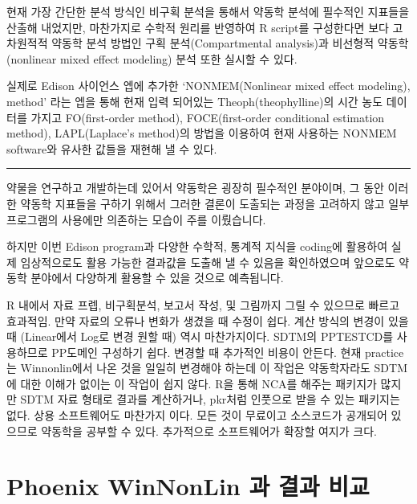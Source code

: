 \documentclass[
  10pt,
]{krantz}
\begin{document}
현재 가장 간단한 분석 방식인 비구획 분석을 통해서 약동학 분석에 필수적인 지표들을 산출해 내었지만, 마찬가지로 수학적 원리를 반영하여 R script를 구성한다면 보다 고차원적적 약동학 분석 방법인 구획 분석(Compartmental analysis)과 비선형적 약동학(nonlinear mixed effect modeling) 분석 또한 실시할 수 있다.

실제로 Edison 사이언스 엡에 추가한 `NONMEM(Nonlinear mixed effect modeling), method' 라는 엡을 통해 현재 입력 되어있는 Theoph(theophylline)의 시간 농도 데이터를 가지고 FO(first-order method), FOCE(first-order conditional estimation method), LAPL(Laplace's method)의 방법을 이용하여 현재 사용하는 NONMEM software와 유사한 값들을 재현해 낼 수 있다.

\begin{center}\rule{0.5\linewidth}{0.5pt}\end{center}

약물을 연구하고 개발하는데 있어서 약동학은 굉장히 필수적인 분야이며, 그 동안 이러한 약동학 지표들을 구하기 위해서 그러한 결론이 도출되는 과정을 고려하지 않고 일부 프로그램의 사용에만 의존하는 모습이 주를 이뤘습니다.

하지만 이번 Edison program과 다양한 수학적, 통계적 지식을 coding에 활용하여 실제 임상적으로도 활용 가능한 결과값을 도출해 낼 수 있음을 확인하였으며 앞으로도 약동학 분야에서 다양하게 활용할 수 있을 것으로 예측됩니다.

R 내에서 자료 프렙, 비구획분석, 보고서 작성, 및 그림까지 그릴 수 있으므로 빠르고 효과적임. 만약 자료의 오류나 변화가 생겼을 때 수정이 쉽다. 계산 방식의 변경이 있을때 (Linear에서 Log로 변경 원할 때) 역시 마찬가지이다.
SDTM의 PPTESTCD를 사용하므로 PP도메인 구성하기 쉽다. 변경할 때 추가적인 비용이 안든다. 현재 practice는 Winnonlin에서 나온 것을 일일히 변경해야 하는데 이 작업은 약동학자라도 SDTM에 대한 이해가 없이는 이 작업이 쉽지 않다. R을 통해 NCA를 해주는 패키지가 많지만 SDTM 자료 형태로 결과를 계산하거나, pkr처럼 인풋으로 받을 수 있는 패키지는 없다. 상용 소프트웨어도 마찬가지 이다.
모든 것이 무료이고 소스코드가 공개되어 있으므로 약동학을 공부할 수 있다. 추가적으로 소프트웨어가 확장할 여지가 크다.

\cleardoublepage

\hypertarget{appendix-appendix}{%
\appendix {}}


\hypertarget{wnl-comparison}{%
\chapter{Phoenix WinNonLin 과 결과 비교}\label{wnl-comparison}}
\end{document}
